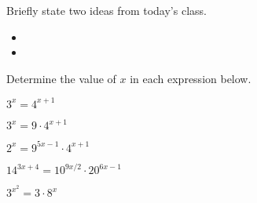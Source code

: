 \postClass

\begin{problem}
\item Briefly state two ideas from today's class.
  \begin{itemize}
  \item
  \item
  \end{itemize}
\item Determine the value of $x$ in each expression below.
  \begin{subproblem}
    \item $3^x = 4^{x+1}$
    \item $3^x = 9\cdot 4^{x+1}$
    \item $2^x = 9^{5x-1}\cdot 4^{x+1}$
    \item $14^{3x+4} = 10^{9x/2}\cdot 20^{6x-1}$
    \item $3^{x^2} = 3 \cdot 8^x$
  \end{subproblem}
\end{problem}


